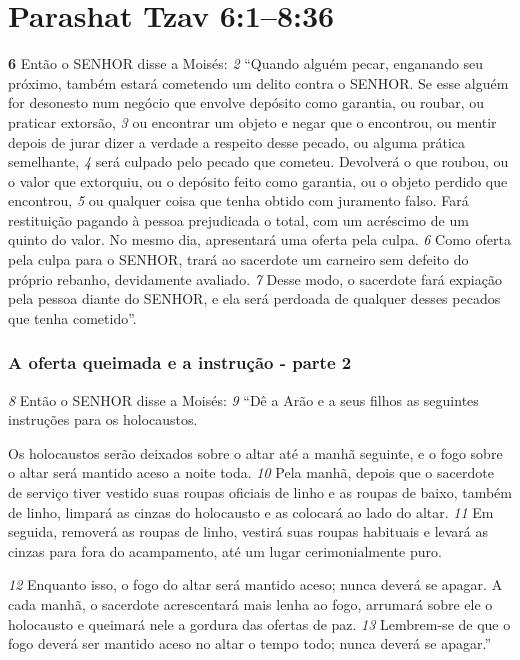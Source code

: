 \section*{Parashat Tzav 6:1–8:36}
\textbf{\large 6} Então o SENHOR disse a Moisés: 
\textit{\tiny 2} 
“Quando alguém pecar, enganando seu
próximo, também estará cometendo um delito contra o SENHOR. Se esse alguém
for desonesto num negócio que envolve depósito como garantia, ou roubar, ou
praticar extorsão, 
\textit{\tiny 3} 
ou encontrar um objeto e negar que o encontrou, ou mentir
depois de jurar dizer a verdade a respeito desse pecado, ou alguma prática
semelhante, 
\textit{\tiny 4} 
será culpado pelo pecado que cometeu. Devolverá o que roubou, ou
o valor que extorquiu, ou o depósito feito como garantia, ou o objeto perdido que
encontrou, 
\textit{\tiny 5} 
ou qualquer coisa que tenha obtido com juramento falso. Fará
restituição pagando à pessoa prejudicada o total, com um acréscimo de um
quinto do valor. No mesmo dia, apresentará uma oferta pela culpa. 
\textit{\tiny 6} 
Como oferta
pela culpa para o SENHOR, trará ao sacerdote um carneiro sem defeito do próprio
rebanho, devidamente avaliado. 
\textit{\tiny 7} 
Desse modo, o sacerdote fará expiação pela
pessoa diante do SENHOR, e ela será perdoada de qualquer desses pecados que
tenha cometido”.

\bigskip
\subsubsection*{A oferta queimada e a instrução - parte 2}  
\textit{\tiny 8} 
Então o SENHOR disse a Moisés: 
\textit{\tiny 9} 
“Dê a Arão e a seus filhos as seguintes
instruções para os holocaustos. 

\smallskip
Os holocaustos serão deixados sobre o altar até a
manhã seguinte, e o fogo sobre o altar será mantido aceso a noite toda. 
\textit{\tiny 10}
Pela
manhã, depois que o sacerdote de serviço tiver vestido suas roupas oficiais de
linho e as roupas de baixo, também de linho, limpará as cinzas do holocausto e as
colocará ao lado do altar. 
\textit{\tiny 11}
Em seguida, removerá as roupas de linho, vestirá suas
roupas habituais e levará as cinzas para fora do acampamento, até um lugar
cerimonialmente puro. 

\smallskip
\textit{\tiny 12}
Enquanto isso, o fogo do altar será mantido aceso;
nunca deverá se apagar. A cada manhã, o sacerdote acrescentará mais lenha ao
fogo, arrumará sobre ele o holocausto e queimará nele a gordura das ofertas de
paz. 
\textit{\tiny 13}
Lembrem-se de que o fogo deverá ser mantido aceso no altar o tempo todo;
nunca deverá se apagar.”


